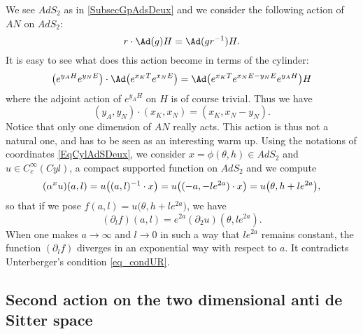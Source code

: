 We see $AdS_2$ as in \ref{SubsecGpAdsDeux} and we consider the following action of $AN$ on $AdS_2$:
\[ 
  r\cdot\Ad(g)H=\Ad(gr^{-1})H.
\]
It is easy to see what does this action become in terms of the cylinder:
\[ 
  \big(  e^{y_AH} e^{y_NE} \big)\cdot \Ad\big(  e^{x_KT} e^{x_NE} \big)
	=\Ad\big(   e^{x_KT} e^{x_NE-y_NE} e^{y_AH}  \big)H
\]
where the adjoint action of $ e^{y_AH}$ on $H$ is of course trivial. Thus we have
\begin{equation}
(y_A,y_N)\cdot (x_K,x_N)=(x_K,x_N-y_N).
\end{equation}
Notice that only one dimension of $AN$ really acts. This action is thus not a natural one, and has to be seen as an interesting warm up. Using the notations of coordinates \eqref{EqCylAdSDeux}, we consider $x=\phi(\theta,h)\in AdS_2$ and $u\in  C^{\infty}_c(Cyl)$, a compact supported function on $AdS_2$ and we compute
\[ 
(\alpha^xu)(a,l)=u\big( (a,l)^{-1}\cdot x \big)\\
		=u\big( (-a,-l  e^{2a})\cdot x \big)\\
		=u\big( \theta,h+l e^{2a} \big),
\]
so that if we pose $f(a,l)=u\big( \theta,h+l e^{2a} \big)$, we have
\[ 
  (\partial_lf)(a,l)= e^{2a}(\partial_2u)(\theta,l e^{2a}).
\]
When one makes $a\to\infty$ and $l\to 0$ in such a way that $l e^{2a}$ remains constant, the function $(\partial_lf)$ diverges in an exponential way with respect to $a$. It contradicts Unterberger's condition \eqref{eq_condUR}.
  
\subsection{Second action on the two dimensional anti de Sitter space}

